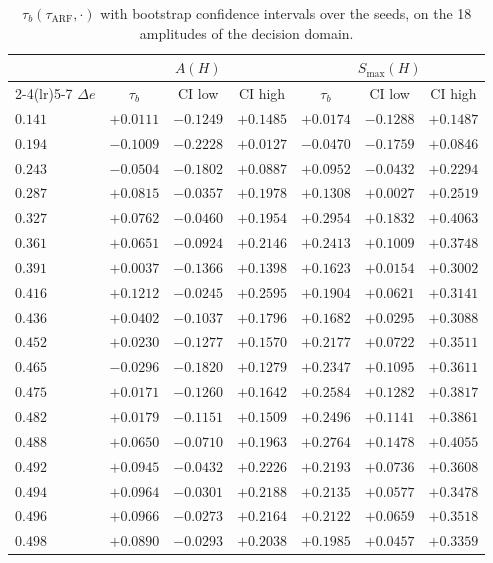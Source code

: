 \documentclass[10pt,conference]{IEEEtran}
\theoremstyle{definition}
\begin{document}
\begin{table}[t]
  \centering
\caption{$\tau_b(\tau_{\mathrm{ARF}}, \cdot)$ with bootstrap confidence intervals over
  the seeds, on the 18 amplitudes of the decision domain.}
\label{tab:strat}
  \small
  \begin{tabular}{lcccccc}
    \toprule
    & \multicolumn{3}{c}{$A(H)$} & \multicolumn{3}{c}{$S_{\max}(H)$} \\
    \cmidrule(lr){2-4}\cmidrule(lr){5-7}
    $\Delta e$ & $\tau_b$ & CI low & CI high & $\tau_b$ & CI low & CI high \\
    \midrule
    $0.141$ & $+0.0111$ & $-0.1249$ & $+0.1485$ & $+0.0174$ & $-0.1288$ & $+0.1487$ \\
    $0.194$ & $-0.1009$ & $-0.2228$ & $+0.0127$ & $-0.0470$ & $-0.1759$ & $+0.0846$ \\
    $0.243$ & $-0.0504$ & $-0.1802$ & $+0.0887$ & $+0.0952$ & $-0.0432$ & $+0.2294$ \\
    $0.287$ & $+0.0815$ & $-0.0357$ & $+0.1978$ & $+0.1308$ & $+0.0027$ & $+0.2519$ \\
    $0.327$ & $+0.0762$ & $-0.0460$ & $+0.1954$ & $+0.2954$ & $+0.1832$ & $+0.4063$ \\
    $0.361$ & $+0.0651$ & $-0.0924$ & $+0.2146$ & $+0.2413$ & $+0.1009$ & $+0.3748$ \\
    $0.391$ & $+0.0037$ & $-0.1366$ & $+0.1398$ & $+0.1623$ & $+0.0154$ & $+0.3002$ \\
    $0.416$ & $+0.1212$ & $-0.0245$ & $+0.2595$ & $+0.1904$ & $+0.0621$ & $+0.3141$ \\
    $0.436$ & $+0.0402$ & $-0.1037$ & $+0.1796$ & $+0.1682$ & $+0.0295$ & $+0.3088$ \\
    $0.452$ & $+0.0230$ & $-0.1277$ & $+0.1570$ & $+0.2177$ & $+0.0722$ & $+0.3511$ \\
    $0.465$ & $-0.0296$ & $-0.1820$ & $+0.1279$ & $+0.2347$ & $+0.1095$ & $+0.3611$ \\
    $0.475$ & $+0.0171$ & $-0.1260$ & $+0.1642$ & $+0.2584$ & $+0.1282$ & $+0.3817$ \\
    $0.482$ & $+0.0179$ & $-0.1151$ & $+0.1509$ & $+0.2496$ & $+0.1141$ & $+0.3861$ \\
    $0.488$ & $+0.0650$ & $-0.0710$ & $+0.1963$ & $+0.2764$ & $+0.1478$ & $+0.4055$ \\
    $0.492$ & $+0.0945$ & $-0.0432$ & $+0.2226$ & $+0.2193$ & $+0.0736$ & $+0.3608$ \\
    $0.494$ & $+0.0964$ & $-0.0301$ & $+0.2188$ & $+0.2135$ & $+0.0577$ & $+0.3478$ \\
    $0.496$ & $+0.0966$ & $-0.0273$ & $+0.2164$ & $+0.2122$ & $+0.0659$ & $+0.3518$ \\
    $0.498$ & $+0.0890$ & $-0.0293$ & $+0.2038$ & $+0.1985$ & $+0.0457$ & $+0.3359$ \\
    \bottomrule
  \end{tabular}

\end{table}
\end{document}
